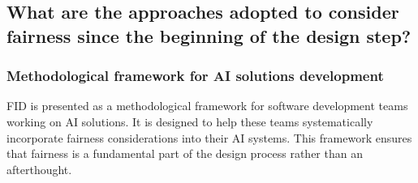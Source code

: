 \documentclass{article}
\begin{document}
\newpage
\subsection{What are the approaches adopted to consider fairness since the beginning of the design step?}
\subsubsection{Methodological framework for AI solutions development}
FID is presented as a methodological framework for software development teams working on AI solutions. It is designed to help these teams systematically incorporate fairness considerations into their AI systems. This framework ensures that fairness is a fundamental part of the design process rather than an afterthought.
\end{document}
